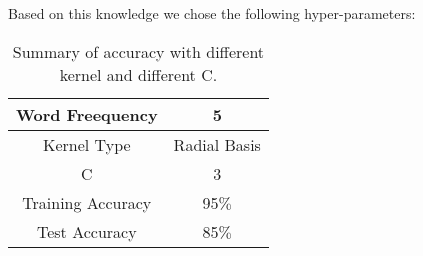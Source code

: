 Based on this knowledge we chose the following hyper-parameters:


\begin{table}[!h]
	\begin{center}
	\begin{tabular}{c | c}
		\hline
		Word Freequency & 5 \\ \hline 
		
		
		Kernel Type & Radial Basis \\  \hline 
		
		C & 3 \\  \hline 
		
		Training Accuracy & 95$\%$ \\  \hline 
		
		Test Accuracy & 85$\%$ \\ 
		\hline
	\end{tabular}
	\end{center}
	\caption{Summary of accuracy with different kernel and different C.}
	\label{tb:table4}
\end{table}	